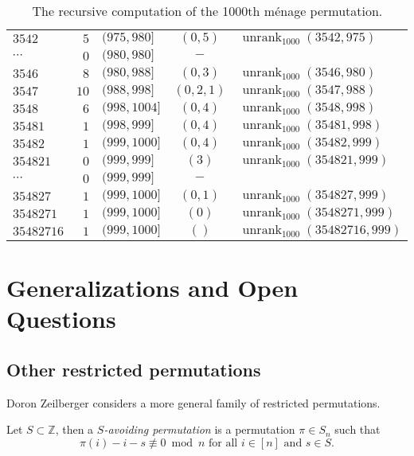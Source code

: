 \begin{example}
\begin{table}
\begin{tabular}{|l|r|l|c|l|}
      $3542    $ & $5$   & $(975,980]$        & $(0,5)$   & $\operatorname{unrank}_{1000}(3542,975)$     \\
      $\cdots$   & $0$   & $(980,980]$        & $-$       & \\
      $3546    $ & $8$   & $(980,988]$        & $(0,3)$   & $\operatorname{unrank}_{1000}(3546,980)$     \\
      $3547    $ & $10$  & $(988,998]$        & $(0,2,1)$ & $\operatorname{unrank}_{1000}(3547,988)$     \\
      $3548    $ & $6$   & $(998,1004]$       & $(0,4)$   & $\operatorname{unrank}_{1000}(3548,998)$     \\ \hline
      $35481   $ & $1$   & $(998,999]$        & $(0,4)$   & $\operatorname{unrank}_{1000}(35481,998)$    \\
      $35482   $ & $1$   & $(999,1000]$       & $(0,4)$   & $\operatorname{unrank}_{1000}(35482,999)$    \\ \hline
      $354821  $ & $0$   & $(999,999]$        & $(3)$     & $\operatorname{unrank}_{1000}(354821,999)$   \\
      $\cdots$   & $0$   & $(999,999]$        & $-$       & \\
      $354827  $ & $1$   & $(999,1000]$       & $(0,1)$   & $\operatorname{unrank}_{1000}(354827,999)$   \\ \hline
      $3548271 $ & $1$   & $(999,1000]$       & $(0)$     & $\operatorname{unrank}_{1000}(3548271,999)$  \\ \hline
      $35482716$ & $1$   & $(999,1000]$       & $()$      & $\operatorname{unrank}_{1000}(35482716,999)$ \\ \hline
    \end{tabular}
    \caption[Steps for computing the $1000$th m\'enage permutation in $S_8$.]{
      The recursive computation of the 1000th m\'enage permutation.
    }
  \end{table}
\end{example}

\section{Generalizations and Open Questions}
\subsection{Other restricted permutations}
Doron Zeilberger considers a more general family of restricted permutations.
\begin{definition}
  Let $S \subset \mathbb Z$, then a \textit{$S$-avoiding permutation} is a
  permutation $\pi \in S_n$ such that \[
    \pi(i) - i - s \not\equiv 0 \bmod n \text{ for all } i \in [n] \text{ and } s \in S.
  \]
\end{definition}

